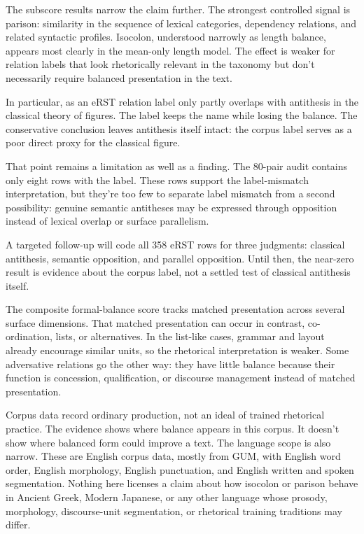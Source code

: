 \documentclass[12pt]{article}
\begin{document}
The subscore results narrow the claim further. The strongest controlled
signal is parison: similarity in the sequence of lexical categories,
dependency relations, and related syntactic profiles. Isocolon, understood
narrowly as length balance, appears most clearly in the mean-only length
model. The effect is weaker for relation labels that look rhetorically
relevant in the taxonomy but don't necessarily require balanced
presentation in the text.

In particular,  as an eRST relation label
only partly overlaps with antithesis in the classical theory of figures.
The label  keeps the name while losing
the balance. The conservative conclusion leaves antithesis itself intact:
the corpus label  serves as a poor direct
proxy for the classical figure.

That point remains a limitation as well as a finding. The 80-pair audit
contains only eight rows with the  label.
These rows support the label-mismatch interpretation, but they're too few
to separate label mismatch from a second possibility: genuine semantic
antitheses may be expressed through opposition instead of lexical
overlap or surface parallelism.

A targeted follow-up will code all 358 eRST
 rows for three judgments: classical
antithesis, semantic opposition, and parallel opposition. Until then, the
near-zero  result is evidence about the
corpus label, not a settled test of classical antithesis itself.

The composite formal-balance score tracks matched presentation across
several surface dimensions. That matched presentation can occur in
contrast, co-ordination, lists, or alternatives. In the list-like cases, grammar and
layout already encourage similar units, so the rhetorical interpretation
is weaker. Some adversative relations go the other way: they have little
balance because their function is concession, qualification, or discourse
management instead of matched presentation.

Corpus data record ordinary production, not an ideal of trained
rhetorical practice. The evidence shows where balance appears in
this corpus. It doesn't show where balanced form could improve a text.
The language scope is also narrow. These are English corpus data, mostly
from GUM, with English word order, English morphology, English punctuation,
and English written and spoken segmentation. Nothing here licenses a
claim about how isocolon or parison behave in Ancient Greek, Modern
Japanese, or any other language whose prosody, morphology, discourse-unit
segmentation, or rhetorical training traditions may differ.
\end{document}
